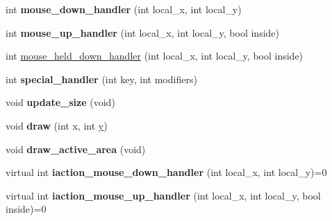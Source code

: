 \begin{DoxyCompactItemize}
\item 
\hypertarget{class_g_l_u_i___mouse___interaction_ae21d31df518cdd5c6542d8cc88681a57}{int {\bfseries mouse\+\_\+down\+\_\+handler} (int local\+\_\+x, int local\+\_\+y)}\label{class_g_l_u_i___mouse___interaction_ae21d31df518cdd5c6542d8cc88681a57}

\item 
\hypertarget{class_g_l_u_i___mouse___interaction_a03d3c78048418b27f8bbe258f6f455e2}{int {\bfseries mouse\+\_\+up\+\_\+handler} (int local\+\_\+x, int local\+\_\+y, bool inside)}\label{class_g_l_u_i___mouse___interaction_a03d3c78048418b27f8bbe258f6f455e2}

\item 
int \hyperlink{class_g_l_u_i___mouse___interaction_a91bf2ba2ff20dab94ef634e38fbfaa84}{mouse\+\_\+held\+\_\+down\+\_\+handler} (int local\+\_\+x, int local\+\_\+y, bool inside)
\item 
\hypertarget{class_g_l_u_i___mouse___interaction_aadcfba66761f87037341c7031e225746}{int {\bfseries special\+\_\+handler} (int key, int modifiers)}\label{class_g_l_u_i___mouse___interaction_aadcfba66761f87037341c7031e225746}

\item 
\hypertarget{class_g_l_u_i___mouse___interaction_a29237239a861d24ab52b971b0d2fead2}{void {\bfseries update\+\_\+size} (void)}\label{class_g_l_u_i___mouse___interaction_a29237239a861d24ab52b971b0d2fead2}

\item 
\hypertarget{class_g_l_u_i___mouse___interaction_ab51243d0750f3cc8f950e046c4bffd13}{void {\bfseries draw} (int x, int \hyperlink{_ice_utils_8h_aa7ffaed69623192258fb8679569ff9ba}{y})}\label{class_g_l_u_i___mouse___interaction_ab51243d0750f3cc8f950e046c4bffd13}

\item 
\hypertarget{class_g_l_u_i___mouse___interaction_aacb2dd881015d1f7e8eeced3796e3a6d}{void {\bfseries draw\+\_\+active\+\_\+area} (void)}\label{class_g_l_u_i___mouse___interaction_aacb2dd881015d1f7e8eeced3796e3a6d}

\item 
\hypertarget{class_g_l_u_i___mouse___interaction_ab4168e2ccfdb1a8afe2b220e53902b8d}{virtual int {\bfseries iaction\+\_\+mouse\+\_\+down\+\_\+handler} (int local\+\_\+x, int local\+\_\+y)=0}\label{class_g_l_u_i___mouse___interaction_ab4168e2ccfdb1a8afe2b220e53902b8d}

\item 
\hypertarget{class_g_l_u_i___mouse___interaction_aaeab42a0986281d21e2b3ab24efb527d}{virtual int {\bfseries iaction\+\_\+mouse\+\_\+up\+\_\+handler} (int local\+\_\+x, int local\+\_\+y, bool inside)=0}\label{class_g_l_u_i___mouse___interaction_aaeab42a0986281d21e2b3ab24efb527d}


\end{DoxyCompactItemize}
